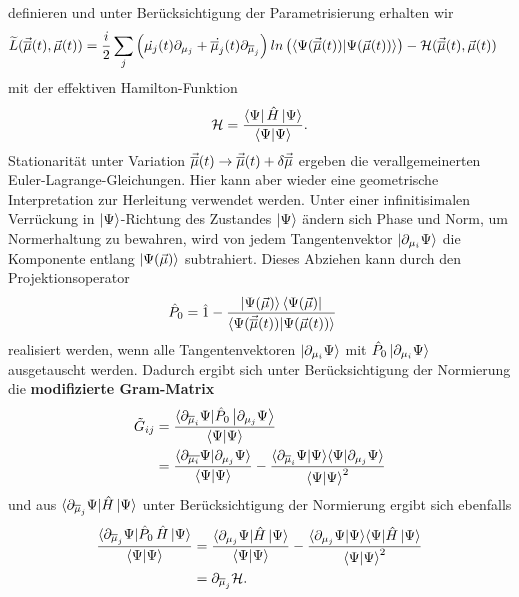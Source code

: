 definieren und unter Berücksichtigung der Parametrisierung erhalten wir
\begin{align}
        \widetilde{L}(\vec{\overline{\mu}}(t),\vec{\mu}(t)) &= \frac{i}{2}\sum_j\left(\dot{\mu_j}(t)\partial_{\mu_j} + \dot{\overline{\mu}_j}(t)\partial_{\overline{\mu}_j}\right)
        ln\left(\langle\Psi(\vec{\overline{\mu}}(t))|\Psi(\vec{\mu}(t))\rangle\right) - \mathcal{H}(\vec{\overline{\mu}}(t),\vec{\mu}(t))
\end{align}
mit der effektiven Hamilton-Funktion
\begin{align}
    \mathcal{H} = \frac{\bra{\Psi}\hat{H}\ket{\Psi}}{\bra{\Psi}\ket{\Psi}}.
\end{align}
Stationarität unter Variation $\vec{\overline{\mu}}(t)\rightarrow \vec{\overline{\mu}}(t) + \delta\vec{\overline{\mu}}$ ergeben die 
verallgemeinerten Euler-Lagrange-Gleichungen. Hier kann aber wieder eine geometrische Interpretation zur Herleitung verwendet werden. Unter einer 
infinitisimalen Verrückung in $\ket{\Psi}$-Richtung des Zustandes $\ket{\Psi}$ ändern sich Phase und Norm, um Normerhaltung zu bewahren, wird von jedem 
Tangentenvektor $\ket{\partial_{\mu_i}\Psi}$ die Komponente entlang $\ket{\Psi(\vec{\mu})}$ subtrahiert. Dieses Abziehen kann durch den 
Projektionsoperator 
\begin{align}
    \hat{P}_0 &= \hat{1} - \frac{\ket{\Psi(\vec{\mu})}\bra{\Psi(\vec{\mu})}}{\langle\Psi(\vec{\overline{\mu}}(t))|\Psi(\vec{\mu}(t))\rangle}
\end{align}
realisiert werden, wenn alle Tangentenvektoren $\ket{\partial_{\mu_i}\Psi}$ mit $\hat{P}_0\ket{\partial_{\mu_i}\Psi}$ ausgetauscht werden.
Dadurch ergibt sich unter Berücksichtigung der Normierung die \textbf{modifizierte Gram-Matrix}
\begin{align}
    \tilde{G}_{ij} &= \frac{\langle\partial_{\overline{\mu}_i}\Psi|\hat{P}_0\ket{\partial_{\mu_j}\Psi}}{\bra{\Psi}\ket{\Psi}}  \nonumber \\
    &= \frac{\langle\partial_{\overline{\mu_i}}\Psi|\partial_{\mu_j}\Psi\rangle}{\bra{\Psi}\ket{\Psi}}
    - \frac{\langle\partial_{\overline{\mu}_i}\Psi|\Psi\rangle\langle\Psi|\partial_{\mu_j}\Psi\rangle}{\bra{\Psi}\ket{\Psi}^2}
\end{align}
und aus $ \langle\partial_{\overline{\mu}_j}\Psi|\hat{H}\ket{\Psi}$ unter Berücksichtigung der Normierung ergibt sich ebenfalls
\begin{align}
    \frac{\langle\partial_{\overline{\mu}_j}\Psi|\hat{P}_0\thinspace\hat{H}\ket{\Psi}}{\langle\Psi|\Psi\rangle}    
                &= \frac{\langle\partial_{\mu_j}\Psi|\hat{H}\ket{\Psi}}{\bra{\Psi}\ket{\Psi}} 
                - \frac{\langle\partial_{\mu_j}\Psi|\Psi\rangle\langle\Psi|\hat{H}\ket{\Psi}}{\bra{\Psi}\ket{\Psi}^2} \nonumber \\
                &= \partial_{\overline{\mu}_j}\mathcal{H} .               
\end{align}

